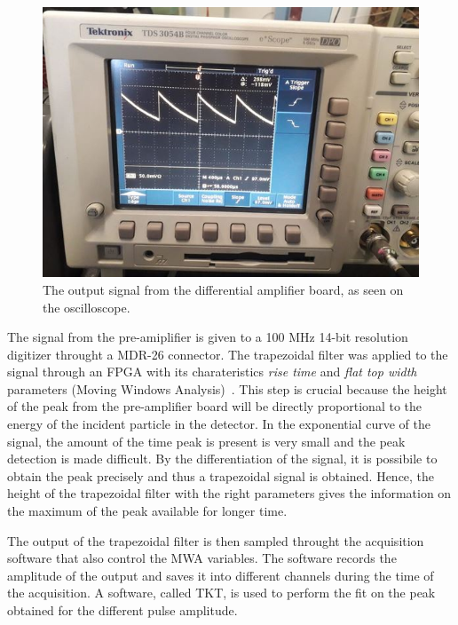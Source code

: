 \begin{figure}[h]
  \centering
  \includegraphics[scale=.35]{img/test_signal_oscilloscope.JPG}
  \caption{The output signal from the differential amplifier board, as seen on the oscilloscope.}
  \label{osc}
\end{figure}

\bigbreak

The signal from the pre-amiplifier is given to a 100 MHz 14-bit resolution digitizer throught a MDR-26 connector.
The trapezoidal filter was applied to the signal through an FPGA with its charateristics \emph{rise time} and \emph{flat top width} parameters (Moving Windows Analysis)~\cite{salathe}. This step is crucial because the height of the peak from the pre-amplifier board will be directly proportional to the energy of the incident particle in the detector. In the exponential curve of the signal, the amount of the time peak is present is very small and the peak detection is made difficult. By the differentiation of the signal, it is possibile to obtain the peak precisely and thus a trapezoidal signal is obtained. 
Hence, the height of the trapezoidal filter with the right parameters gives the information on the maximum of the peak available for longer time.

\bigbreak

The output of the trapezoidal filter is then sampled throught the acquisition software that also control the MWA variables. The software records the amplitude of the output and saves it into different channels during the time of the acquisition. A software, called TKT, is used to perform the fit on the peak obtained for the different pulse amplitude. 

